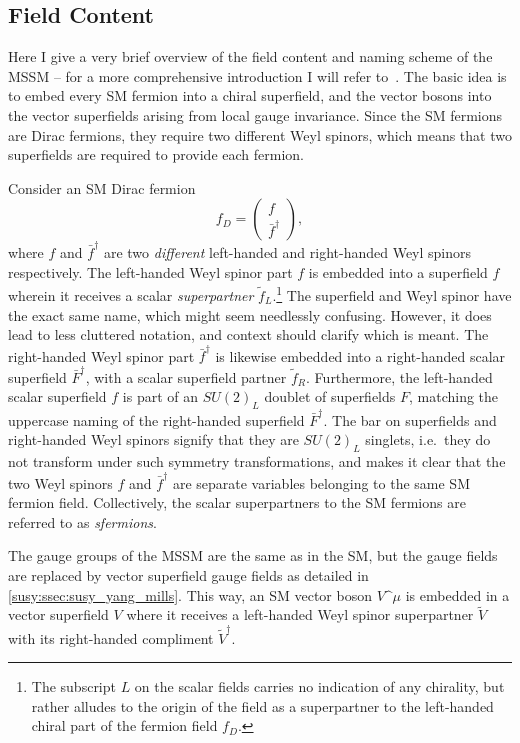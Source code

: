 \documentclass[../main.tex]{subfiles}
\begin{document}
\subsection{Field Content}
Here I give a very brief overview of the field content and naming scheme of the MSSM -- for a more comprehensive introduction I will refer to~\cite{Martin:1997ns}.
The basic idea is to embed every SM fermion into a chiral superfield, and the vector bosons into the vector superfields arising from local gauge invariance.
Since the SM fermions are Dirac fermions, they require two different Weyl spinors, which means that two superfields are required to provide each fermion.

Consider an SM Dirac fermion
\begin{equation}
  f_D = \begin{pmatrix}
    f \\ \bar{f}^\dagger
  \end{pmatrix},
\end{equation}
where \(f\) and \(\bar{f}^\dagger\) are two \emph{different} left-handed and right-handed Weyl spinors respectively.
The left-handed Weyl spinor part \(f\) is embedded into a superfield \(f\) wherein it receives a scalar \emph{superpartner} \(\tilde{f}_L\).\footnote{The subscript \(L\) on the scalar fields carries no indication of any chirality, but rather alludes to the origin of the field as a superpartner to the left-handed chiral part of the fermion field \(f_D\).}
The superfield and Weyl spinor have the exact same name, which might seem needlessly confusing. However, it does lead to less cluttered notation, and context should clarify which is meant.
The right-handed Weyl spinor part \(\bar{f}^\dagger\) is likewise embedded into a right-handed scalar superfield \(\bar{F}^\dagger\), with a scalar superfield partner \(\tilde{f}_R\).
Furthermore, the left-handed scalar superfield \(f\) is part of an \(SU(2)_L\) doublet of superfields \(F\), matching the uppercase naming of the right-handed superfield \(\bar{F}^\dagger\).
The bar on superfields and right-handed Weyl spinors signify that they are \(SU(2)_L\) singlets, i.e.\ they do not transform under such symmetry transformations, and makes it clear that the two Weyl spinors \(f\) and \(\bar{f}^\dagger\) are separate variables belonging to the same SM fermion field.
Collectively, the scalar superpartners to the SM fermions are referred to as \emph{sfermions}.

The gauge groups of the MSSM are the same as in the SM, but the gauge fields are replaced by vector superfield gauge fields as detailed in \cref{susy:ssec:susy_yang_mills}.
This way, an SM vector boson \(V\^\mu\) is embedded in a vector superfield \(V\) where it receives a left-handed Weyl spinor superpartner \(\tilde{V}\) with its right-handed compliment \(\tilde{V}^\dagger\).
\end{document}
